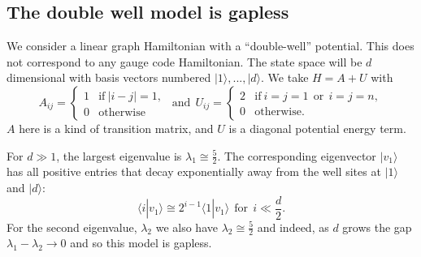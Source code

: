 \documentclass[11pt,oneside]{article}
\def\Ham{H}
\newcommand{\ket}[1]{|{#1}\rangle}
\newcommand{\braket}[2]{\langle{#1}|{#2}\rangle}
\begin{document}
\subsection{The double well model is gapless}

We consider a linear graph Hamiltonian
with a ``double-well'' potential.
This does not correspond to any gauge code Hamiltonian.
The state space will be $d$ dimensional with
basis vectors numbered $\ket{1},...,\ket{d}.$
We take
$ \Ham = A + U $
with
$$
A_{ij} = \left\{ \begin{array}{ll}
     1 &\mbox{if}\  |i-j|=1,  \\
     0 &\mbox{otherwise}\end{array}\right.
\ \ \mbox{and}\ \ 
U_{ij} =  \left\{ \begin{array}{ll}
     2 &\mbox{if}\  i=j=1 \ \ \mbox{or}\ \  i=j=n, \\
     0 &\mbox{otherwise.}\end{array}\right.
$$
$A$ here is a kind of transition matrix,
and $U$ is a diagonal potential energy term.

For $d\gg 1$, the largest
eigenvalue is $\lambda_1 \cong \frac{5}{2}$.
The corresponding eigenvector $\ket{v_1}$
has all positive entries that
decay exponentially away from the well sites
at $\ket{1}$ and $\ket{d}:$
$$
    \braket{i}{v_1} 
    \cong 2^{i-1} \braket{1}{v_1}
    \ \ \mbox{for}\ \ i\ll \frac{d}{2}.
$$
For the second eigenvalue, $\lambda_2$
we also have  $\lambda_2 \cong \frac{5}{2}$
and indeed, as $d$ grows
the gap $\lambda_1 - \lambda_2 \rightarrow 0$
and so this model is gapless.
\end{document}
